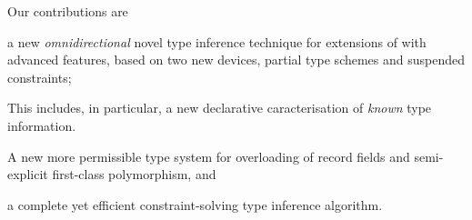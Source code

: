 \documentclass[acmsmall,screen,nonacm]{acmart}
\begin{document}
Our contributions are 
\begin{enumerate*}
\item
  a new \emph{omnidirectional} novel type inference technique for
  extensions of \ML with advanced features, based on two new devices,
  partial type schemes and suspended constraints;


\item
  This includes, in particular, a new declarative caracterisation of
  \emph{known} type information.
  

\item
  A new more permissible type system for overloading of record fields and
  semi-explicit first-class polymorphism, and

\item
  a complete yet efficient constraint-solving type inference algorithm.
  
\end{enumerate*}
\end{document}
